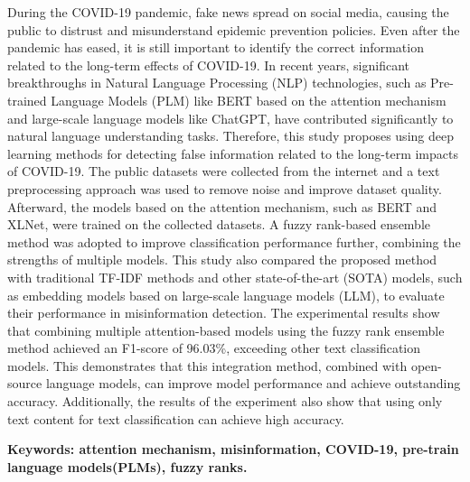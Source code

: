 During the COVID-19 pandemic, fake news spread on social media, causing the public to distrust and misunderstand epidemic prevention policies. Even after the pandemic has eased, it is still important to identify the correct information related to the long-term effects of COVID-19.
In recent years, significant breakthroughs in Natural Language Processing (NLP) technologies, such as Pre-trained Language Models (PLM) like BERT based on the attention mechanism and large-scale language models like ChatGPT, have contributed significantly to natural language understanding tasks. Therefore, this study proposes using deep learning methods for detecting false information related to the long-term impacts of COVID-19.
The public datasets were collected from the internet and a text preprocessing approach was used to remove noise and improve dataset quality. Afterward, the models based on the attention mechanism, such as BERT and XLNet, were trained on the collected datasets. A fuzzy rank-based ensemble method was adopted to improve classification performance further, combining the strengths of multiple models. This study also compared the proposed method with traditional TF-IDF methods and other state-of-the-art (SOTA) models, such as embedding models based on large-scale language models (LLM), to evaluate their performance in misinformation detection.
The experimental results show that combining multiple attention-based models using the fuzzy rank ensemble method achieved an F1-score of 96.03\%, exceeding other text classification models. This demonstrates that this integration method, combined with open-source language models, can improve model performance and achieve outstanding accuracy. Additionally, the results of the experiment also show that using only text content for text classification can achieve high accuracy.


\vspace{0.5cm}

\textbf{Keywords: attention mechanism, misinformation,  COVID-19,  pre-train language models(PLMs), fuzzy ranks.} 
